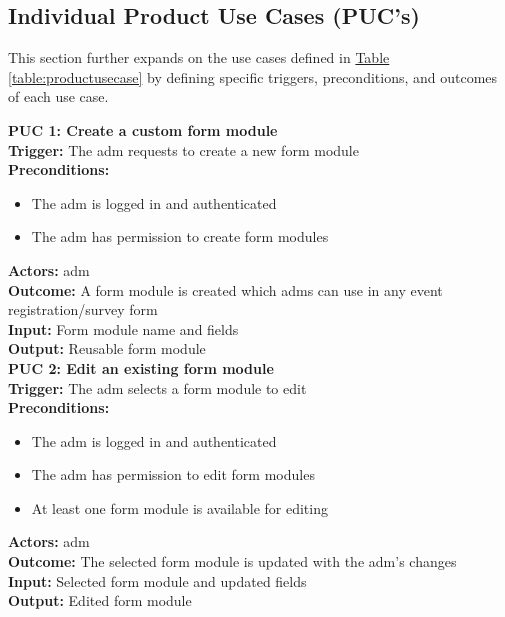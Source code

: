 \documentclass[12pt]{article}
\begin{document}
\subsection{Individual Product Use Cases (PUC's)}

This section further expands on the use cases defined in \hyperref[table:productusecase]{Table \ref{table:productusecase}} by defining specific triggers, preconditions, and outcomes of each use case. \\

{\setlength{\parindent}{0pt}
\textbf{PUC 1: Create a custom form module} \\
\textbf{Trigger:} The \gls{adm} requests to create a new form module \\
\textbf{Preconditions:}
\begin{itemize}
  \item The \gls{adm} is logged in and authenticated
  \item The \gls{adm} has permission to create form modules
\end{itemize}
\textbf{Actors:} \Gls{adm} \\
\textbf{Outcome:} A form module is created which \glspl{adm} can use in any event registration/survey form \\
\textbf{Input:} Form module name and fields \\
\textbf{Output:} Reusable form module \\[1em]

\textbf{PUC 2: Edit an existing form module} \\
\textbf{Trigger:} The \gls{adm} selects a form module to edit \\
\textbf{Preconditions:}
\begin{itemize}
  \item The \gls{adm} is logged in and authenticated
  \item The \gls{adm} has permission to edit form modules
  \item At least one form module is available for editing
\end{itemize}
\textbf{Actors:} \Gls{adm} \\
\textbf{Outcome:} The selected form module is updated with the \gls{adm}’s changes \\
\textbf{Input:} Selected form module and updated fields \\
\textbf{Output:} Edited form module \\[1em]

}
\end{document}
